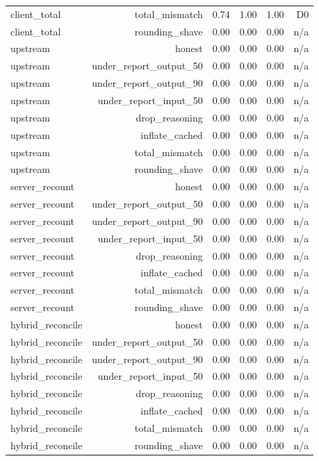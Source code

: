 \begin{table}[t]
{\begin{tabular}{lrrrrr}
client\_total & total\_mismatch & 0.74 & 1.00 & 1.00 & D0 \\
client\_total & rounding\_shave & 0.00 & 0.00 & 0.00 & n/a \\
upstream & honest & 0.00 & 0.00 & 0.00 & n/a \\
upstream & under\_report\_output\_50 & 0.00 & 0.00 & 0.00 & n/a \\
upstream & under\_report\_output\_90 & 0.00 & 0.00 & 0.00 & n/a \\
upstream & under\_report\_input\_50 & 0.00 & 0.00 & 0.00 & n/a \\
upstream & drop\_reasoning & 0.00 & 0.00 & 0.00 & n/a \\
upstream & inflate\_cached & 0.00 & 0.00 & 0.00 & n/a \\
upstream & total\_mismatch & 0.00 & 0.00 & 0.00 & n/a \\
upstream & rounding\_shave & 0.00 & 0.00 & 0.00 & n/a \\
server\_recount & honest & 0.00 & 0.00 & 0.00 & n/a \\
server\_recount & under\_report\_output\_50 & 0.00 & 0.00 & 0.00 & n/a \\
server\_recount & under\_report\_output\_90 & 0.00 & 0.00 & 0.00 & n/a \\
server\_recount & under\_report\_input\_50 & 0.00 & 0.00 & 0.00 & n/a \\
server\_recount & drop\_reasoning & 0.00 & 0.00 & 0.00 & n/a \\
server\_recount & inflate\_cached & 0.00 & 0.00 & 0.00 & n/a \\
server\_recount & total\_mismatch & 0.00 & 0.00 & 0.00 & n/a \\
server\_recount & rounding\_shave & 0.00 & 0.00 & 0.00 & n/a \\
hybrid\_reconcile & honest & 0.00 & 0.00 & 0.00 & n/a \\
hybrid\_reconcile & under\_report\_output\_50 & 0.00 & 0.00 & 0.00 & n/a \\
hybrid\_reconcile & under\_report\_output\_90 & 0.00 & 0.00 & 0.00 & n/a \\
hybrid\_reconcile & under\_report\_input\_50 & 0.00 & 0.00 & 0.00 & n/a \\
hybrid\_reconcile & drop\_reasoning & 0.00 & 0.00 & 0.00 & n/a \\
hybrid\_reconcile & inflate\_cached & 0.00 & 0.00 & 0.00 & n/a \\
hybrid\_reconcile & total\_mismatch & 0.00 & 0.00 & 0.00 & n/a \\
hybrid\_reconcile & rounding\_shave & 0.00 & 0.00 & 0.00 & n/a \\
\bottomrule
\end{tabular}
}
\end{table}
